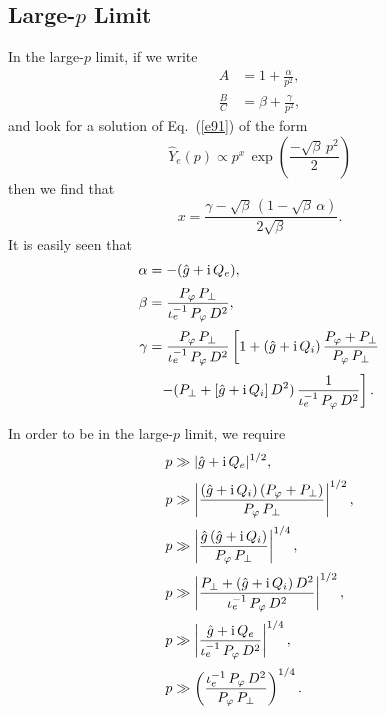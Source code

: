 \documentclass[12pt,prb,aps,notitlepage]{revtex4-1}
\begin{document}
\subsection{Large-$p$ Limit}\label{large}
In the large-$p$ limit, if we write
\begin{align}
A &=1+\frac{\alpha}{p^2},\\[0.5ex]
\frac{B}{C} &= \beta+\frac{\gamma}{p^2},
\end{align}
and
look for a solution of Eq.~(\ref{e91}) of the form
\begin{equation}
\hat{Y}_e(p) \propto p^x\,\exp\left(\frac{-\sqrt{\beta}\,p^2}{2}\right)
\end{equation}
then we find that
\begin{equation}
x = \frac{\gamma -\sqrt{\beta}\,(1-\sqrt{\beta}\,\alpha)}{2\sqrt{\beta}}.
\end{equation}
It is easily seen that
\begin{align}
\alpha &= -(\hat{g}+ {\rm i}\,Q_e),\\[0.5ex]
\beta&= \frac{P_\varphi\,P_\perp}{\iota_e^{-1}\,P_\varphi\,D^2},\\[0.5ex]
\gamma&= \frac{P_\varphi\,P_\perp}{\iota_e^{-1}\,P_\varphi\,D^2}\left[1+ (\hat{g}+{\rm i}\,Q_i)\,\frac{P_\varphi+P_\perp}{P_\varphi\,P_\perp}\right.\nonumber\\[0.5ex]
&\phantom{=}\left.-(P_\perp+[\hat{g}+{\rm i}\,Q_i]\,D^2)\,\frac{1}{\iota_e^{-1}\,P_\varphi\,D^2}\right].
\end{align}

In order to be in the large-$p$ limit, we require
\begin{align}
p&\gg |\hat{g}+{\rm i}\,Q_e|^{1/2},\\[0.5ex]
p&\gg\left|\frac{(\hat{g}+{\rm i}\,Q_i)\,(P_\varphi + P_\perp)}{P_\varphi\,P_\perp}\right|^{1/2},\\[0.5ex]
p&\gg \left|\frac{\hat{g}\,(\hat{g}+{\rm i}\,Q_i)}{P_\varphi\,P_\perp}\right|^{1/4},\\[0.5ex]
p&\gg \left|\frac{P_\perp+(\hat{g}+{\rm i}\,Q_i)\,D^2}{\iota_e^{-1}\,P_\varphi\,D^2}\right|^{1/2},\\[0.5ex]
p&\gg \left|\frac{\hat{g}+{\rm i}\,Q_e}{\iota_e^{-1}\,P_\varphi\,D^2}\right|^{1/4},\\[0.5ex]
p&\gg \left(\frac{\iota_e^{-1}\,P_\varphi\,D^2}{P_\varphi\,P_\perp}\right)^{1/4}.
\end{align} 
\end{document}
